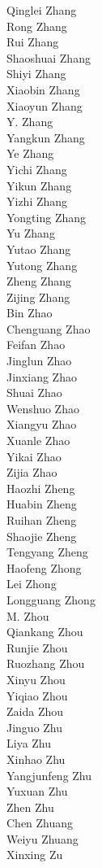 Qinglei Zhang\\
Rong Zhang\\
Rui Zhang\\
Shaoshuai Zhang\\
Shiyi Zhang\\
Xiaobin Zhang\\
Xiaoyun Zhang\\
Y. Zhang\\
Yangkun Zhang\\
Ye Zhang\\
Yichi Zhang\\
Yikun Zhang\\
Yizhi Zhang\\
Yongting Zhang\\
Yu Zhang\\
Yutao Zhang\\
Yutong Zhang\\
Zheng Zhang\\
Zijing Zhang\\
Bin Zhao\\
Chenguang Zhao\\
Feifan Zhao\\
Jinglun Zhao\\
Jinxiang Zhao\\
Shuai Zhao\\
Wenshuo Zhao\\
Xiangyu Zhao\\
Xuanle Zhao\\
Yikai Zhao\\
Zijia Zhao\\
Haozhi Zheng\\
Huabin Zheng\\
Ruihan Zheng\\
Shaojie Zheng\\
Tengyang Zheng\\
Haofeng Zhong\\
Lei Zhong\\
Longguang Zhong\\
M. Zhou\\
Qiankang Zhou\\
Runjie Zhou\\
Ruozhang Zhou\\
Xinyu Zhou\\
Yiqiao Zhou\\
Zaida Zhou\\
Jinguo Zhu\\
Liya Zhu\\
Xinhao Zhu\\
Yangjunfeng Zhu\\
Yuxuan Zhu\\
Zhen Zhu\\
Chen Zhuang\\
Weiyu Zhuang\\
Xinxing Zu\\
